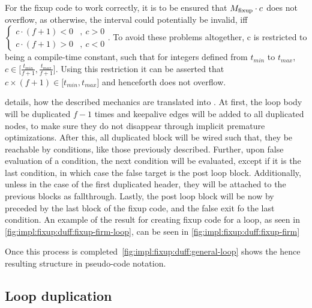 



For the fixup code to work correctly, it is to be ensured that $M_{\text{fixup}} \cdot c$ does not overflow, as otherwise, the interval \cinterval could potentially be invalid, iff $
\begin{cases}
    c \cdot (f + 1) < 0 &, \medspace c > 0\\
    c \cdot (f + 1) > 0 &, \medspace c < 0
\end{cases}$.
To avoid these problems altogether, c is restricted to being a compile-time constant, such that for integers defined from $t_{min}$ to $t_{max}$, $c \in \lbrack \frac{t_{min}}{f + 1}, \frac{t_{max}}{f + 1} \rbrack$.
Using this restriction it can be asserted that $c \times (f + 1) \in \lbrack t_{min}, t_{max} \rbrack$ and henceforth does not overflow.

 details, how the described mechanics are translated into \libFIRM.
At first, the loop body will be duplicated $f - 1$ times and keepalive edges will be added to all duplicated nodes, to make sure they do not disappear through implicit premature optimizations.
After this, all duplicated block will be wired such that, they be reachable by conditions, like those previously described.
Further, upon false evaluation of a condition, the next condition will be evaluated, except if it is the last condition, in which case the false target is the post loop block.
Additionally, unless in the case of the first duplicated header, they will be attached to the previous blocks as fallthrough.
Lastly, the post loop block will be now by preceded by the last block of the fixup code, and the false exit fo the last condition.
An example of the result for creating fixup code for a loop, as seen in \cref{fig:impl:fixup:duff:fixup-firm-loop}, can be seen in \cref{fig:impl:fixup:duff:fixup-firm}









Once this process is completed~\cref{fig:impl:fixup:duff:general-loop} shows the hence resulting structure in pseudo-code notation.


\subsection{Loop duplication}\label{sec:impl:fixup:loop}

